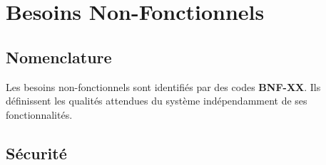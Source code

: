 \documentclass[12pt,a4paper,openany]{report}
\begin{document}
\chapter{Besoins Non-Fonctionnels}

\section{Nomenclature}

Les besoins non-fonctionnels sont identifiés par des codes \textbf{BNF-XX}. Ils définissent les qualités attendues du système indépendamment de ses fonctionnalités.

\section{Sécurité}
\end{document}
